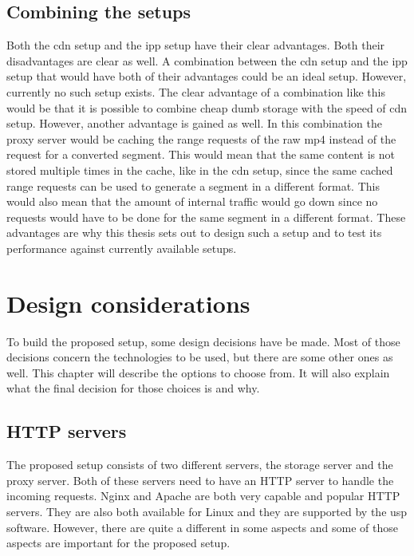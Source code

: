 \documentclass[twoside,openright]{uva-bachelor-thesis}
\begin{document}
\section{Combining the setups}
Both the \gls{cdn} setup and the \gls{ipp} setup have their clear advantages.
Both their disadvantages are clear as well. A combination between the \gls{cdn}
setup and the \gls{ipp} setup that would have both of their advantages could be
an ideal setup. However, currently no such setup exists. The clear advantage
of a combination like this would be that it is possible to combine cheap dumb
storage with the speed of \gls{cdn} setup. However, another advantage is gained
as well. In this combination the proxy server would be caching the range
requests of the raw mp4 instead of the request for a converted segment. This
would mean that the same content is not stored multiple times in the cache, like
in the \gls{cdn} setup, since the same cached range requests can be used to
generate a segment in a different format. This would also mean that the amount
of internal traffic would go down since no requests would have to be done for
the same segment in a different format. These advantages are why this thesis
sets out to design such a setup and to test its performance against currently
available setups.







\chapter{Design considerations}\label{ch:design}
To build the proposed setup, some design decisions have be made. Most of those
decisions concern the technologies to be used, but there are some other ones as
well. This chapter will describe the options to choose from. It will also
explain what the final decision for those choices is and why.


\section{HTTP servers}
The proposed setup consists of two different servers, the storage server and the
proxy server. Both of these servers need to have an HTTP server to handle the
incoming requests. Nginx and Apache are both very capable and popular HTTP
servers. They are also both available for Linux and they are supported by the
\gls{usp} software. However, there are quite a different in some aspects and some
of those aspects are important for the proposed setup.
\end{document}
